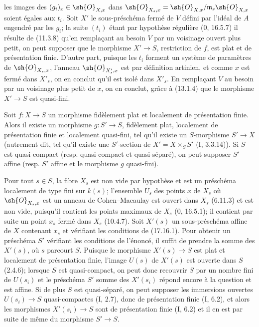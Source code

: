 
les images des $(g_i)_x\in\sh{O}_{X,x}$ dans $\sh{O}_{X_s,x}=\sh{O}_{X,x}/\mathfrak m_s\sh{O}_{X,x}$ soient égales aux $t_i$. Soit $X'$ le sous-préschéma fermé de $V$ défini par l'idéal de $A$ engendré par les $g_i$; la suite $(t_i)$ étant par hypothèse régulière (0, 16.5.7) il résulte de (11.3.8) qu'en remplaçant au besoin $V$ par un voisinage ouvert plus petit, on peut supposer que le morphisme $X'\to S$, restriction de $f$, est plat et de présentation finie. D'autre part, puisque les $t_i$ forment un système de paramètres de $\sh{O}_{X_s,x}$, l'anneau $\sh{O}_{X'_s,x}$ est par définition artinien, et comme $x$ est fermé dans $X'_s$, on en conclut qu'il est isolé dans $X'_s$. En remplaçant $V$ au besoin par un voisinage plus petit de $x$, on en conclut, grâce à (13.1.4) que le morphisme $X'\to S$ est quasi-fini.

\begin{corollary}[17.16.2]
\label{IV.17.16.2}
Soit $f:X\to S$ un morphisme fidèlement plat et localement de présentation finie. Alors il existe un morphisme $g:S'\to S$, fidèlement plat, localement de présentation finie et localement quasi-fini, tel qu'il existe un $S$-morphisme $S'\to X$ (autrement dit, tel qu'il existe une $S'$-section de $X'=X\times_S S'$ (I, 3.3.14)). Si $S$ est quasi-compact (resp. quasi-compact et quasi-séparé), on peut supposer $S'$ affine (resp. $S'$ affine et le morphisme $g$ quasi-fini).
\end{corollary}

Pour tout $s\in S$, la fibre $X_s$ est non vide par hypothèse et est un préschéma localement de type fini sur $k(s)$; l'ensemble $U_s$ des points $x$ de $X_s$ où $\sh{O}_{X_s,x}$ est un anneau de Cohen--Macaulay est ouvert dans $X_s$ (6.11.3) et est non vide, puisqu'il contient les points maximaux de $X_s$ (0, 16.5.1); il contient par suite un point $x_s$ fermé dans $X_s$ (10.4.7). Soit $X'(s)$ un sous-préschéma affine de $X$ contenant $x_s$ et vérifiant les conditions de (17.16.1). Pour obtenir un préschéma $S'$ vérifiant les conditions de l'énoncé, il suffit de prendre la somme des $X'(s)$, où $s$ parcourt $S$. Puisque le morphisme $X'(s)\to S$ est plat et localement de présentation finie, l'image $U(s)$ de $X'(s)$ est ouverte dans $S$ (2.4.6); lorsque $S$ est quasi-compact, on peut donc recouvrir $S$ par un nombre fini de $U(s_i)$ et le préschéma $S'$ somme des $X'(s_i)$ répond encore à la question et est affine. Si de plus $S$ est quasi-séparé, on peut supposer les immersions ouvertes $U(s_i)\to S$ quasi-compactes (I, 2.7), donc de présentation finie (I, 6.2), et alors les morphismes $X'(s_i)\to S$ sont de présentation finie (I, 6.2) et il en est par suite de même du morphisme $S'\to S$.

